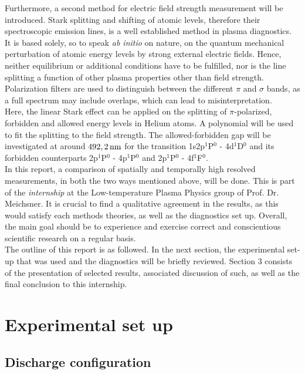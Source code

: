 \documentclass[a4paper,10pt]{article}
\newcommand{\tilt}[1]{\textit{#1}}
\newcommand{\groupname}{Low-temperature Plasma Physics group} %
\begin{document}
		Furthermore, a second method for electric field \linebreak strength measurement will be introduced. Stark splitting and shifting of atomic levels, therefore their spectroscopic emission lines, is a well established method in plasma diagnostics. It is based solely, so to speak \tilt{ab initio} on nature, on the quantum mechanical perturbation of atomic energy levels by strong external electric fields. Hence, neither equilibrium or additional conditions have to be fulfilled, nor is the line splitting a function of other plasma properties other than field strength. Polarization filters are used to distinguish between the different $\pi$ and $\sigma$ bands, as a full spectrum may include overlaps, which can lead to misinterpretation.\\
		Here, the linear Stark effect can be applied on the splitting of $\pi$-polarized, forbidden and allowed energy levels in Helium atoms. A polynomial will be used to fit the splitting to the field strength. The allowed-forbidden gap will be investigated at around $\unit[492,2]{nm}$ for the transition 1s2p$^1$P$^0$ - 4d$^1$D$^0$ and its forbidden counterparts 2p$^1$P$^0$ - 4p$^1$P$^0$ and 2p$^1$P$^0$ - 4f$^1$F$^0$.\\
		In this report, a comparison of spatially and temporally high resolved measurements, in both the two ways mentioned above, will be done. This is part of the \tilt{internship} at the \groupname\,\,of Prof. Dr. Meichsner. It is crucial to find a qualitative agreement in the results, as this would satisfy each methods theories, as well as the diagnostics set up. Overall, the main goal should be to experience and exercise correct and conscientious scientific research on a regular basis.\\
		The outline of this report is as followed. In the next section, the experimental set-up that was used and the diagnostics will be briefly reviewed. Section 3 consists of the presentation of selected results, associated discussion of such, as well as the final conclusion to this internship.

	\section{Experimental set up}
	
		\subsection{Discharge configuration}
		
\end{document}
